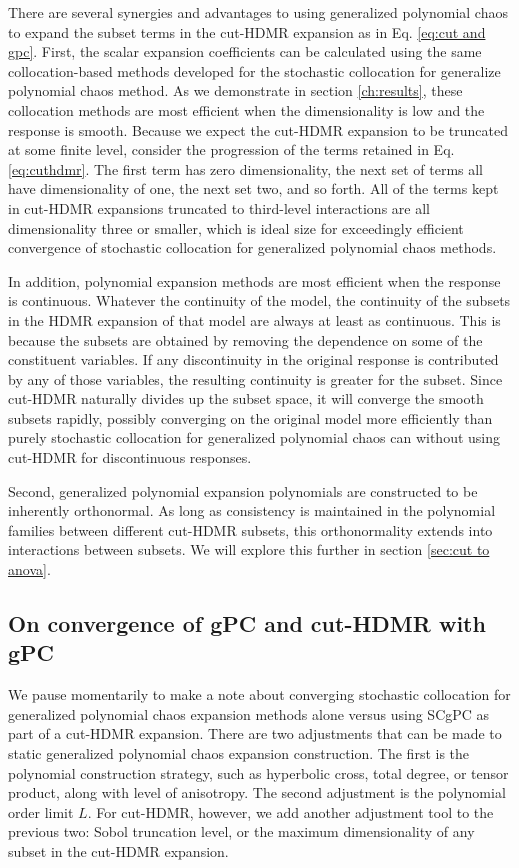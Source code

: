 There are several synergies and advantages to using generalized polynomial chaos to expand the subset terms in
the cut-HDMR expansion as in Eq. \ref{eq:cut and gpc}.  First, the scalar expansion coefficients can be calculated using the same
collocation-based methods developed for the stochastic collocation for generalize polynomial chaos method.  
As we demonstrate in section \ref{ch:results},
these collocation methods are most efficient when the dimensionality is low and the response is smooth.
Because we expect the cut-HDMR expansion to be truncated at some finite level, consider the progression of the
terms retained in Eq. \ref{eq:cuthdmr}. The first term has zero dimensionality, the next set of terms all have
dimensionality of one, the next set two, and so forth.  All of the terms kept in cut-HDMR expansions
truncated to third-level interactions are all dimensionality three or smaller, which is ideal size for
exceedingly efficient convergence of stochastic collocation for generalized polynomial chaos methods. 

In
addition, polynomial expansion methods are most efficient when the response is continuous.  Whatever the
continuity of the model, the continuity of the subsets in the HDMR expansion of that model are always at
least as continuous.  This is because the subsets are obtained by removing the dependence on some of the
constituent variables.  If any discontinuity in the original response is contributed by any of those variables,
the resulting continuity is greater for the subset.
Since cut-HDMR naturally divides up the subset space, it will
converge the smooth subsets rapidly, possibly converging on the original model more efficiently than purely
stochastic collocation for generalized polynomial chaos can without using cut-HDMR for discontinuous responses.

Second, generalized polynomial expansion polynomials are constructed to be inherently orthonormal.  As long as
consistency is maintained in the polynomial families between different cut-HDMR subsets, this orthonormality
extends into interactions between subsets.  We will explore this further in section \ref{sec:cut to anova}.

\subsection{On convergence of gPC and cut-HDMR with gPC}
We pause momentarily to make a note about converging stochastic collocation for generalized polynomial chaos
expansion methods alone versus using SCgPC as part of a cut-HDMR expansion.  There are two adjustments that
can be made to static generalized polynomial chaos expansion construction.  The first is the polynomial
construction strategy, such as hyperbolic cross, total degree, or tensor product, along with level of
anisotropy.  The second adjustment is the polynomial order limit $L$.  For cut-HDMR, however, we add another
adjustment tool to the previous two: Sobol truncation level, or the maximum dimensionality of any subset in
the cut-HDMR expansion.

